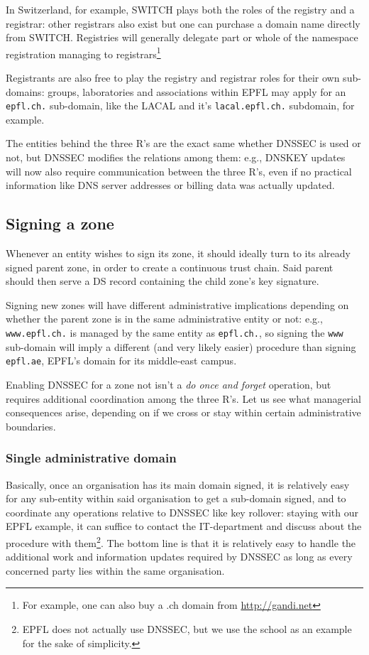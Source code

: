 \documentclass[a4paper,twocolumn]{scrartcl}
\begin{document}
In Switzerland, for example, SWITCH plays both the roles of the registry and a registrar: other registrars also exist but one can purchase a domain name directly from SWITCH. Registries will generally delegate part or whole of the namespace registration managing to registrars\footnote{For example, one can also buy a .ch domain from \url{http://gandi.net}}

Registrants are also free to play the registry and registrar roles for their own sub-domains: groups, laboratories and associations within EPFL may apply for an \verb|epfl.ch.| sub-domain, like the LACAL and it's \verb|lacal.epfl.ch.| subdomain, for example.

The entities behind the three R's are the exact same whether DNSSEC is used or not, but DNSSEC modifies the relations among them: e.g., DNSKEY updates will now also require communication between the three R's, even if no practical information like DNS server addresses or billing data was actually updated.

\subsection{Signing a zone}
Whenever an entity wishes to sign its zone, it should ideally turn to its already signed parent zone, in order to create a continuous trust chain.
Said parent should then serve a DS record containing the child zone's key signature.

Signing new zones will have different administrative implications depending on whether the parent zone is in the same administrative entity or not: e.g., \verb|www.epfl.ch.| is managed by the same entity as \verb|epfl.ch.|, so signing the \verb|www| sub-domain will imply a different (and very likely easier) procedure than signing \verb|epfl.ae|, EPFL's domain for its middle-east campus.

Enabling DNSSEC for a zone not isn't a \emph{do once and forget} operation, but requires additional coordination among the three R's. Let us see what managerial consequences arise, depending on if we cross or stay within certain administrative boundaries.

\subsubsection{Single administrative domain}
Basically, once an organisation has its main domain signed, it is relatively easy for any sub-entity within said organisation to get a sub-domain signed, and to coordinate any operations relative to DNSSEC like key rollover: staying with our EPFL example, it can suffice to contact the IT-department and discuss about the procedure with them\footnote{EPFL does not actually use DNSSEC, but we use the school as an example for the sake of simplicity.}. The bottom line is that it is relatively easy to handle the additional work and information updates required by DNSSEC as long as every concerned party lies within the same organisation.
\end{document}
